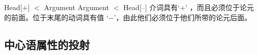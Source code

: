 \eal
\ex\label{lp-ini-arg} 
Head[\initial$+$] $<$ Argument
\ex 
Argument $<$ Head[\initial --]
\zl
介词具有\initialv `$+$' ，而且必须位于论元的前面。位于末尾的动词具有值 `$-$'，由此他们必须位于他们所带的论元后面。
\eal
{}
\ex[*]{
\gll {}[[den Schrank] in]\\
     \hspaceThis{[[}DET 壁橱 PREP\\
}
\zl

\subsection{中心语属性的投射}
\label{Abschnitt-Kopfeigenschaften}

